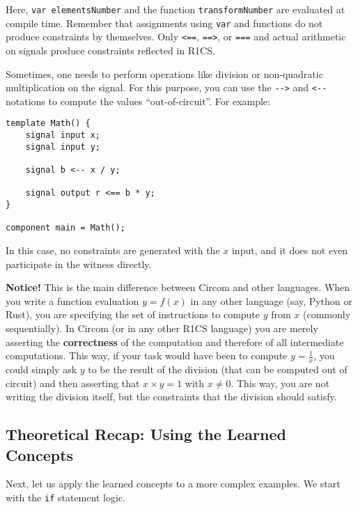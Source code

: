 \documentclass[../lecture-notes-148x210.tex]{subfiles}
\begin{document}
Here, \texttt{var elementsNumber} and the function \texttt{transformNumber}
are evaluated at compile time. Remember that assignments using \texttt{var} and
functions do not produce constraints by themselves. Only \texttt{<==},
\texttt{==>}, or \texttt{===} and actual arithmetic on signals produce
constraints reflected in R1CS.

\begin{remark}
    Sometimes, one needs to perform operations like division or non-quadratic multiplication on the signal.
    For this purpose, you can use the \texttt{{-}->} and \texttt{<-{-}} notations to compute the values ``out-of-circuit''. For example:

    \begin{lstlisting}[language=Circom,numbers=none]
template Math() {
    signal input x;
    signal input y;

    signal b <-- x / y;

    signal output r <== b * y;
}

component main = Math();
    \end{lstlisting}\label{code:division-example}

    In this case, no constraints are generated with the $x$ input, and it does not even participate in the witness directly.

    \textcolor{green!50!black}{\textbf{Notice!}} This is the main difference between Circom and other languages. When you
    write a function evaluation $y = f(x)$ in any other language (say, Python or Rust),
    you are specifying the set of instructions to compute $y$ from $x$ (commonly
    sequentially). In Circom (or in any other R1CS language) you are merely asserting
    the \textbf{correctness} of the computation and therefore of all
    intermediate computations. This way, if your task would have been to compute
    $y = \frac{1}{x}$, you could simply ask $y$ to be the result of the division
    (that can be computed out of circuit) and then asserting that $x \times y = 1$
    with $x \neq 0$. This way, you are not writing the division itself, but
    the constraints that the division should satisfy.
\end{remark}

\subsection{Theoretical Recap: Using the Learned Concepts}

Next, let us apply the learned concepts to a more complex examples. We start
with the \texttt{if} statement logic.
\end{document}

